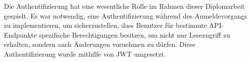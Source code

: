 Die Authentifizierung hat eine wesentliche Rolle im Rahmen dieser Diplomarbeit gespielt. Es war notwendig, eine Authentifizierung während des Anmeldevorgangs zu implementieren, um sicherzustellen, dass Benutzer für bestimmte API-Endpunkte spezifische Berechtigungen besitzen, um nicht nur Lesezugriff zu erhalten, sondern auch Änderungen vornehmen zu dürfen. Diese Authentifizierung wurde mithilfe von JWT umgesetzt.
